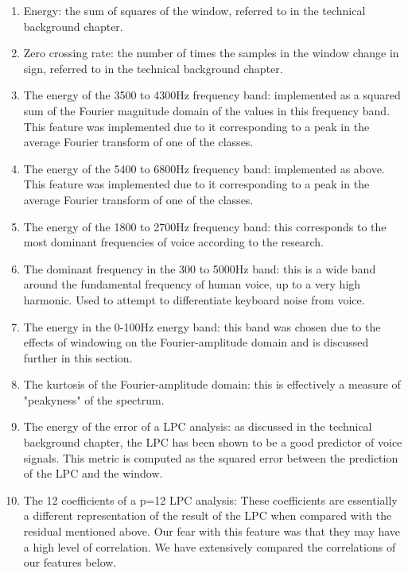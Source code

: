 \documentclass[ %
                    author={Sam Phippen},
                supervisor={Dr. Rafal Bogacz},
                     title={Real time voice activity detectors in noisy personal computing environments},
                  subtitle={},
                    degree={MEng},
                      year={2012} ]{thesis}
\begin{document}
\begin{enumerate}
    \item Energy: the sum of squares of the window, referred to in the technical
        background chapter.

    \item Zero crossing rate: the number of times the samples in the window
        change in sign, referred to in the technical background chapter.

    \item The energy of the 3500 to 4300Hz frequency band: implemented as a
        squared sum of the Fourier magnitude domain of the values in this
        frequency band. This feature was implemented due to it corresponding to
        a peak in the average Fourier transform of one of the classes.

    \item The energy of the 5400 to 6800Hz frequency band: implemented as
        above. This feature was implemented due to it corresponding to a peak
        in the average Fourier transform of one of the classes.

    \item The energy of the 1800 to 2700Hz frequency band: this corresponds to
        the most dominant frequencies of voice according to the research.

    \item The dominant frequency in the 300 to 5000Hz band: this is a wide band
        around the fundamental frequency of human voice, up to a very high
        harmonic. Used to attempt to differentiate keyboard noise from voice.

    \item The energy in the 0-100Hz energy band: this band was chosen due to
        the effects of windowing on the Fourier-amplitude domain and is
        discussed further in this section.

    \item The kurtosis of the Fourier-amplitude domain: this is effectively a
        measure of "peakyness" of the spectrum.

    \item The energy of the error of a LPC analysis: as discussed in the
        technical background chapter, the LPC has been shown to be a good
        predictor of voice signals. This metric is computed as the squared
        error between the prediction of the LPC and the window.

    \item The 12 coefficients of a p=12 LPC analysis: These coefficients
        are essentially a different representation of the result of the LPC
        when compared with the residual mentioned above. Our fear with this
        feature was that they may have a high level of correlation. We have
        extensively compared the correlations of our features below.


\end{enumerate}
\end{document}

